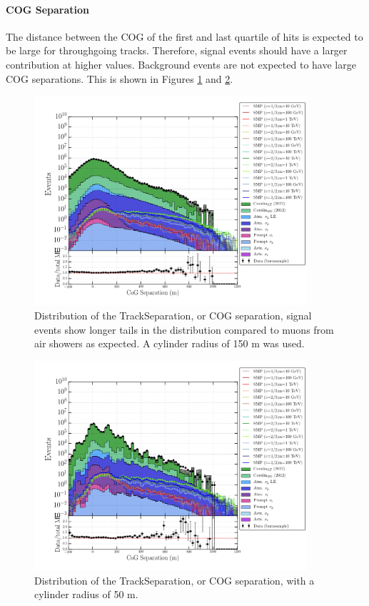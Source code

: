 \paragraph{COG Separation}
The distance between the COG of the first and last quartile of hits is expected to be large for throughgoing tracks. Therefore, signal events should have a larger contribution at higher values. Background events are not expected to have large COG separations. This is shown in Figures \ref{fig:commonvariablestracksep150} and \ref{fig:commonvariablestracksep50}.

\begin{figure}
\centering
\includegraphics[width = 0.9\textwidth]{chapter8/img/1D_stack_trackseparation_150.png}
\caption{Distribution of the TrackSeparation, or COG separation, signal events show longer tails in the distribution compared to muons from air showers as expected. A cylinder radius of 150 m was used.}
\label{fig:commonvariablestracksep150}
\end{figure}

\begin{figure}
\centering
\includegraphics[width = 0.9\textwidth]{chapter8/img/1D_stack_trackseparation_50.png}
\caption{Distribution of the TrackSeparation, or COG separation, with a cylinder radius of 50 m.}
\label{fig:commonvariablestracksep50}
\end{figure}

